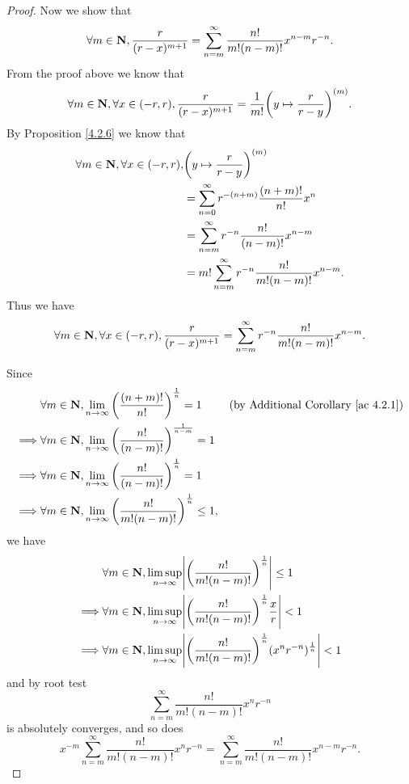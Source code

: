 \begin{proof}
    Now we show that
    \[
        \forall m \in \mathbf{N}, \frac{r}{(r - x)^{m + 1}} = \sum_{n = m}^\infty \frac{n!}{m! (n - m)!} x^{n - m} r^{-n}.
    \]
    From the proof above we know that
    \[
        \forall m \in \mathbf{N}, \forall x \in (-r, r), \frac{r}{(r - x)^{m + 1}} = \frac{1}{m!} \bigg(y \mapsto \frac{r}{r - y}\bigg)^{(m)}.
    \]
    By Proposition \ref{4.2.6} we know that
    \begin{align*}
        \forall m \in \mathbf{N}, \forall x \in (-r, r), & \bigg(y \mapsto \frac{r}{r - y}\bigg)^{(m)}                       \\
                                                 & = \sum_{n = 0}^\infty r^{-(n + m)} \frac{(n + m)!}{n!} x^n        \\
                                                 & = \sum_{n = m}^\infty r^{-n} \frac{n!}{(n - m)!} x^{n - m}        \\
                                                 & = m! \sum_{n = m}^\infty r^{-n} \frac{n!}{m! (n - m)!} x^{n - m}.
    \end{align*}
    Thus we have
    \[
        \forall m \in \mathbf{N}, \forall x \in (-r, r), \frac{r}{(r - x)^{m + 1}} = \sum_{n = m}^\infty r^{-n} \frac{n!}{m! (n - m)!} x^{n - m}.
    \]

    Since
    \begin{align*}
                 & \forall m \in \mathbf{N}, \lim_{n \to \infty} \bigg(\frac{(n + m)!}{n!}\bigg)^{\frac{1}{n}} = 1        & \text{(by Additional Corollary \ref{ac 4.2.1})} \\
        \implies & \forall m \in \mathbf{N}, \lim_{n \to \infty} \bigg(\frac{n!}{(n - m)!}\bigg)^{\frac{1}{n - m}} = 1                                                      \\
        \implies & \forall m \in \mathbf{N}, \lim_{n \to \infty} \bigg(\frac{n!}{(n - m)!}\bigg)^{\frac{1}{n}} = 1                                                          \\
        \implies & \forall m \in \mathbf{N}, \lim_{n \to \infty} \bigg(\frac{n!}{m! (n - m)!}\bigg)^{\frac{1}{n}} \leq 1,
    \end{align*}
    we have
    \begin{align*}
                 & \forall m \in \N, \limsup_{n \to \infty} \abs{\bigg(\frac{n!}{m! (n - m)!}\bigg)^{\frac{1}{n}}} \leq 1                         \\
        \implies & \forall m \in \N, \limsup_{n \to \infty} \abs{\bigg(\frac{n!}{m! (n - m)!}\bigg)^{\frac{1}{n}} \frac{x}{r}} < 1                \\
        \implies & \forall m \in \N, \limsup_{n \to \infty} \abs{\bigg(\frac{n!}{m! (n - m)!}\bigg)^{\frac{1}{n}} (x^n r^{-n})^{\frac{1}{n}}} < 1
    \end{align*}
    and by root test
    \[
        \sum_{n = m}^\infty \frac{n!}{m! (n - m)!} x^n r^{-n}
    \]
    is absolutely converges, and so does
    \[
        x^{-m} \sum_{n = m}^\infty \frac{n!}{m! (n - m)!} x^n r^{-n} = \sum_{n = m}^\infty \frac{n!}{m! (n - m)!} x^{n - m} r^{-n}.
    \]
\end{proof}

